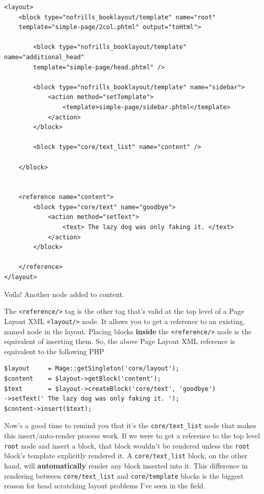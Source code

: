 \documentclass[oneside]{book}
\begin{document}
\begin{lstlisting}
<layout>
    <block type="nofrills_booklayout/template" name="root"
    template="simple-page/2col.phtml" output="toHtml">

        <block type="nofrills_booklayout/template" name="additional_head"
        template="simple-page/head.phtml" />

        <block type="nofrills_booklayout/template" name="sidebar">
            <action method="setTemplate">
                <template>simple-page/sidebar.phtml</template>
            </action>
        </block>

        <block type="core/text_list" name="content" />

    </block>


    <reference name="content">
        <block type="core/text" name="goodbye">
            <action method="setText">
                <text> The lazy dog was only faking it. </text>
            </action>
        </block>

    </reference>
</layout>

\end{lstlisting}


Voila!  Another node added to content.

The \footnotesize\texttt{\textless reference/\textgreater } \normalsize  tag is the other tag that's valid at the top level of a Page Layout XML \footnotesize\texttt{\textless layout/\textgreater } \normalsize  node.  It allows you to get a reference to an existing, named node in the layout.  Placing blocks \textbf{inside} the \footnotesize\texttt{\textless reference/\textgreater } \normalsize  node is the equivalent of inserting them. So, the above Page Layout XML reference is equivalent to the following PHP

\begin{lstlisting}
$layout     = Mage::getSingleton('core/layout');
$content    = $layout->getBlock('content');
$text       = $layout->createBlock('core/text', 'goodbye')
->setText(' The lazy dog was only faking it. ');
$content->insert($text);

\end{lstlisting}


Now's a good time to remind you that it's the \footnotesize\texttt{core/text\_list} \normalsize  node that makes this insert/auto-render process work.  If we were to get a reference to the top level \footnotesize\texttt{root} \normalsize  node and insert a block, that block wouldn't be rendered unless the \footnotesize\texttt{root} \normalsize  block's template explicitly rendered it.  A \footnotesize\texttt{core/text\_list} \normalsize  block, on the other hand, will \textbf{automatically} render any block inserted into it.  This difference in rendering between \footnotesize\texttt{core/text\_list} \normalsize  and \footnotesize\texttt{core/template} \normalsize  blocks is the biggest reason for head scratching layout problems I've seen in the field.
\end{document}
